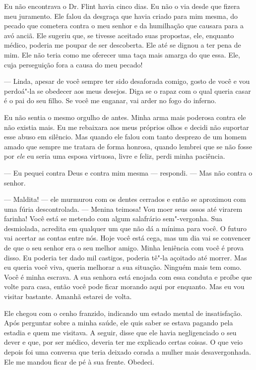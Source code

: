 Eu não encontrava o Dr. Flint havia
cinco dias. Eu não o via desde que fizera meu juramento. Ele falou da
desgraça que havia criado para mim mesma, do pecado que cometera contra
o meu senhor e da humilhação que causara para a avó anciã. Ele sugeriu
que, se tivesse aceitado suas propostas, ele, enquanto médico, poderia
me poupar de ser descoberta. Ele até se dignou a ter pena de mim. Ele
não teria como me oferecer uma taça mais amarga do que essa. Ele, cuja
perseguição fora a causa do meu pecado!

--- Linda, apesar de você sempre ter
sido desaforada comigo, gosto de você e vou perdoá"-la se obedecer aos
meus desejos. Diga se o rapaz com o qual queria casar é o pai do seu
filho. Se você me enganar, vai arder no fogo do inferno.

Eu não sentia o mesmo orgulho de antes.
Minha arma mais poderosa contra ele não existia mais. Eu me rebaixara
aos meus próprios olhos e decidi não suportar esse abuso em silêncio.
Mas quando ele falou com tanto desprezo de um homem amado que sempre me
tratara de forma honrosa, quando lembrei que se não fosse por \emph{ele}
eu seria uma esposa virtuosa, livre e feliz, perdi minha paciência.

--- Eu pequei contra Deus e contra mim mesma --- respondi. --- Mas não
contra o senhor.

--- Maldita! --- ele murmurou com os
dentes cerrados e então se aproximou com uma fúria descontrolada. ---
Menina teimosa! Vou moer seus ossos até virarem farinha! Você está se
metendo com algum salafrário sem"-vergonha. Sua desmiolada, acredita em
qualquer um que não dá a mínima para você. O futuro vai acertar as
contas entre nós. Hoje você está cega, mas um dia vai se convencer de
que o seu senhor era o seu melhor amigo. Minha leniência com você é
prova disso. Eu poderia ter dado mil castigos, poderia tê"-la açoitado
até morrer. Mas eu queria você viva, queria melhorar a sua situação.
Ninguém mais tem como. Você é minha escrava. A sua senhora está enojada
com essa conduta e proíbe que volte para casa, então você pode ficar
morando aqui por enquanto. Mas eu vou visitar bastante. Amanhã estarei
de volta.

Ele chegou com o cenho franzido,
indicando um estado mental de insatisfação. Após perguntar sobre a minha
saúde, ele quis saber se estava pagando pela estadia e quem me visitava.
A seguir, disse que ele havia negligenciado o seu dever e que, por ser
médico, deveria ter me explicado certas coisas. O que veio depois foi
uma conversa que teria deixado corada a mulher mais desavergonhada. Ele
me mandou ficar de pé à sua frente. Obedeci.

